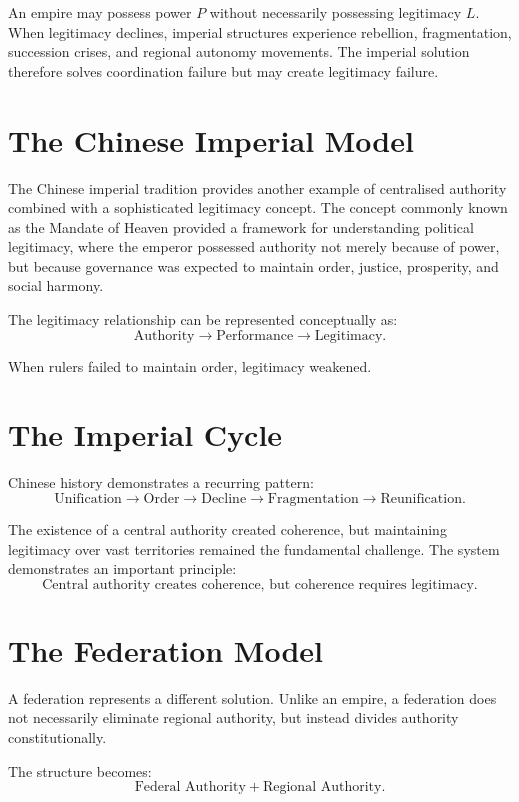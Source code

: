 \documentclass[11pt,openany]{book}
\theoremstyle{plain}
\theoremstyle{definition}
\begin{document}
An empire may possess power \(P\) without necessarily possessing legitimacy \(L\). When legitimacy declines, imperial structures experience rebellion, fragmentation, succession crises, and regional autonomy movements. The imperial solution therefore solves coordination failure but may create legitimacy failure.

\section*{The Chinese Imperial Model}

The Chinese imperial tradition provides another example of centralised authority combined with a sophisticated legitimacy concept. The concept commonly known as the Mandate of Heaven provided a framework for understanding political legitimacy, where the emperor possessed authority not merely because of power, but because governance was expected to maintain order, justice, prosperity, and social harmony.

The legitimacy relationship can be represented conceptually as:
\[
\text{Authority}
\longrightarrow
\text{Performance}
\longrightarrow
\text{Legitimacy}.
\]

When rulers failed to maintain order, legitimacy weakened.

\section*{The Imperial Cycle}

Chinese history demonstrates a recurring pattern:
\[
\text{Unification}
\longrightarrow
\text{Order}
\longrightarrow
\text{Decline}
\longrightarrow
\text{Fragmentation}
\longrightarrow
\text{Reunification}.
\]

The existence of a central authority created coherence, but maintaining legitimacy over vast territories remained the fundamental challenge. The system demonstrates an important principle:
\[
\boxed{
\text{Central authority creates coherence, but coherence requires legitimacy.}
}
\]

\section*{The Federation Model}

A federation represents a different solution. Unlike an empire, a federation does not necessarily eliminate regional authority, but instead divides authority constitutionally.

The structure becomes:
\[
\text{Federal Authority}
+
\text{Regional Authority}.
\]
\end{document}
